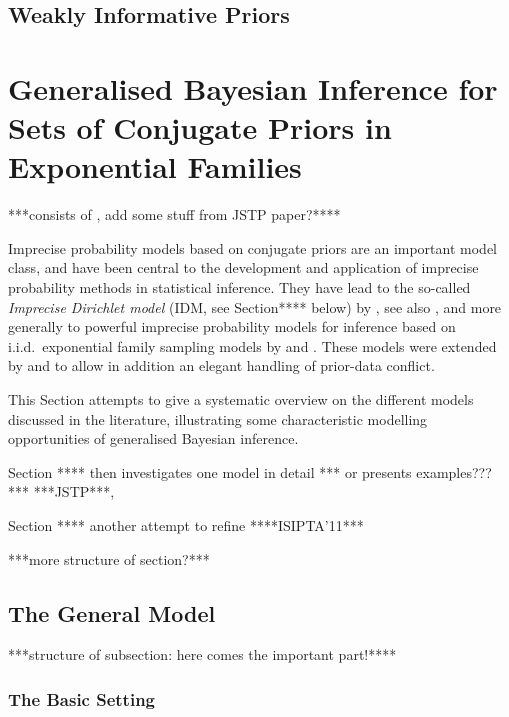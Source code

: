 \subsection{Weakly Informative Priors}
\label{sec:motivation:near-ignorance}



\section{Generalised Bayesian Inference for Sets of Conjugate Priors in Exponential Families}
\label{sec:imprecisebayes-conjugate}

***consists of \textcite[\S 4.3]{itip-statinf}, add some stuff from JSTP paper?****

Imprecise probability models based on conjugate priors are an important model class,
and have been central to the development and application of imprecise probability methods
in statistical inference.
They have lead to the so-called \emph{Imprecise Dirichlet model} (IDM, see Section**** below)
by \textcite{1996:walley::idm}, see also \textcite{2009:bernard},
and more generally to powerful imprecise probability models for inference
based on i.i.d.\ exponential family sampling models by \textcite{2005:quaeghebeurcooman} and \textcite{2009:quaeghebeur::phd}.
These models were extended by \textcite{Walter2009a} and \textcite{Walter2011a}
to allow in addition an elegant handling of prior-data conflict.

This Section attempts to give a systematic overview on the different models discussed in the literature,
illustrating some characteristic modelling opportunities of generalised Bayesian inference.

Section **** then investigates one model in detail *** or presents examples???*** ***JSTP***,

Section **** another attempt to refine ****ISIPTA'11***

***more structure of section?*** 

\subsection{The General Model}

***structure of subsection: here comes the important part!****

\subsubsection{The Basic Setting}

